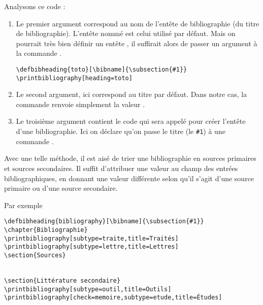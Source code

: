 Analysons ce code :
\begin{enumerate}
\item Le premier argument correspond au nom de l'entête de bibliographie (du titre de bibliographie). L'entête nommé  est celui utilisé par défaut. Mais on pourrait très bien définir un entête , il suffirait alors de passer un argument  à la commande .

\begin{verbatim}
\defbibheading{toto}[\bibname]{\subsection{#1}}
\printbibliography[heading=toto]
\end{verbatim}

\item Le second argument, ici  correspond au titre par défaut. Dans notre cas, la commande  renvoie simplement la valeur .
\item Le troisième argument contient le code qui sera appelé pour créer l'entête d'une bibliographie. Ici on déclare qu'on passe le titre (le \verb|#1|) à une commande .
\end{enumerate}


Avec une telle méthode, il est aisé de trier une bibliographie en sources primaires et sources secondaires. Il suffit d'attribuer une valeur au champ  des entrées bibliographiques, en donnant une valeur différente selon qu'il s'agit d'une source primaire ou d'une source secondaire.

Par exemple
\begin{verbatim}
\defbibheading{bibliography}[\bibname]{\subsection{#1}}
\chapter{Bibliographie}
\printbibliography[subtype=traite,title=Traités]
\printbibliography[subtype=lettre,title=Lettres]
\section{Sources}


\section{Littérature secondaire}
\printbibliography[subtype=outil,title=Outils]
\printbibliography[check=memoire,subtype=etude,title=Études]

\end{verbatim}


